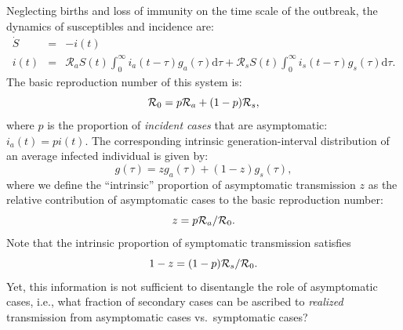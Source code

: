 \documentclass[12pt]{article}
\begin{document}
Neglecting births and loss of immunity on the time scale of the outbreak, the dynamics of susceptibles and incidence are:
\begin{eqnarray}
\dot{S}&=&-i(t) \\
i(t)&=&\mathcal R_a S(t) \int_0^\infty i_a(t-\tau) g_a(\tau) \mathrm{d}\tau + \mathcal R_s S(t) \int_0^\infty i_s(t-\tau) g_s(\tau) \mathrm{d}\tau.
\end{eqnarray}
The basic reproduction number of this system is:
\begin{equation}
{\cal{R}}_{0}= p {\cal{R}}_a + (1-p) {\cal{R}}_s,
\end{equation}
where $p$ is the proportion of \emph{incident cases} that are asymptomatic: $i_a(t) = p i(t)$.
The corresponding intrinsic generation-interval distribution of an average infected individual is given by: 
\begin{equation}
g(\tau) = z g_a(\tau) + (1-z) g_s(\tau),
\end{equation}
where we define the ``intrinsic'' proportion of asymptomatic transmission $z$ as the relative contribution of asymptomatic cases to the basic reproduction number:
\begin{equation}
z = p {\cal{R}}_a/{\cal{R}}_{0}.
\end{equation}
Note that the intrinsic proportion of symptomatic transmission satisfies
\begin{equation}
1-z = (1-p) {\cal{R}}_s/{\cal{R}}_{0}.
\end{equation}
Yet, this information is not sufficient to disentangle the role of asymptomatic cases, i.e., what fraction of secondary cases can be ascribed to \emph{realized} transmission from asymptomatic cases vs.~symptomatic cases?
\end{document}
